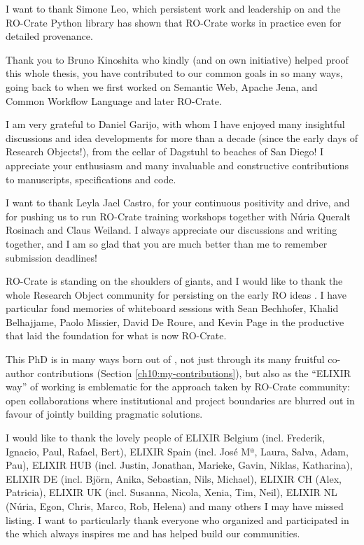 I want to thank Simone Leo, which persistent work and leadership on  and the RO-Crate Python library \cite{De Geest 2023a} has shown that RO-Crate works in practice even for detailed provenance. 

Thank you to Bruno Kinoshita who kindly (and on own initiative) helped proof this whole thesis, you have contributed to our common goals in so many ways, going back to when we first worked on Semantic Web, Apache Jena, and Common Workflow Language and later RO-Crate.

I am very grateful to Daniel Garijo, with whom I have enjoyed many insightful discussions and idea developments for more than a decade (since the early days of Research Objects!), from the cellar of Dagstuhl to beaches of San Diego! I appreciate your enthusiasm and many invaluable and constructive contributions to manuscripts, specifications and code.

I want to thank Leyla Jael Castro, for your continuous positivity and drive, and for pushing us to run RO-Crate training workshops together with Núria Queralt Rosinach and Claus Weiland. I always appreciate our discussions and writing together, and I am so glad that you are much better than me to remember submission deadlines!

RO-Crate is standing on the shoulders of giants, and I would like to thank the whole Research Object community \cite{Goble 2018} for persisting on the early RO ideas \cite{Newman 2009,Bechhofer 2013}. I have particular fond memories of whiteboard sessions with Sean Bechhofer, Khalid Belhajjame, Paolo Missier, David De Roure, and Kevin Page in the productive  that laid the foundation for what is now RO-Crate.

This PhD is in many ways born out of 
, not just 
through its many fruitful co-author contributions 
(Section \vref{ch10:my-contributions}), 
but also as the ``ELIXIR way'' of working is emblematic for the approach taken by RO-Crate community: open collaborations where institutional and project boundaries are blurred out in favour of jointly building pragmatic solutions.

I would like to thank the lovely people of ELIXIR Belgium (incl. Frederik, Ignacio, Paul, Rafael, Bert), ELIXIR Spain (incl. José Mª, Laura, Salva, Adam, Pau), ELIXIR HUB (incl. Justin, Jonathan, Marieke, Gavin, Niklas, Katharina), ELIXIR DE (incl. Björn, Anika, Sebastian, Nils, Michael), ELIXIR CH (Alex, Patricia), ELIXIR UK (incl. Susanna, Nicola, Xenia, Tim, Neil), ELIXIR NL (Núria, Egon, Chris, Marco, Rob, Helena) and many others I may have missed listing. I want to particularly thank everyone who organized and participated in the  which always inspires me and has helped build our communities.

